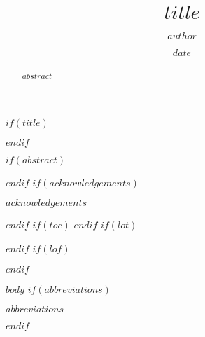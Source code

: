 \documentclass[11pt,twoside]{rhodesthesis}
\title{$title$}
\author{$author$}
\date{$date$}
\begin{document}
$if(title)$
  \maketitle
$endif$

\frontmatter %
\pagestyle{empty} %
$if(abstract)$
  \begin{abstract}
    $abstract$
  \end{abstract}
$endif$
$if(acknowledgements)$
  \begin{acknowledgements}
    $acknowledgements$
  \end{acknowledgements}
$endif$
$if(toc)$
  \hypersetup{linkcolor=$if(toccolor)$$toccolor$$else$black$endif$}
  \setcounter{tocdepth}{$toc-depth$}
  \tableofcontents
$endif$
$if(lot)$
  \listoftables
$endif$
$if(lof)$
  \listoffigures
$endif$

\mainmatter %
\pagestyle{plain}
$body$
$if(abbreviations)$
  \begin{abbreviations}
    $abbreviations$
  \end{abbreviations}
$endif$
\end{document}
